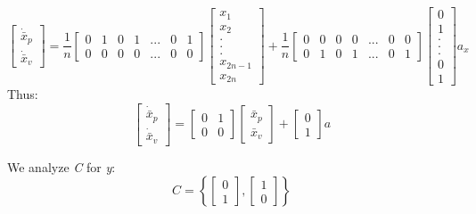 \documentclass[10pt,letterpaper]{article}
\begin{document}
\begin{flushleft}
\begin{equation}
\begin{bmatrix}
\dot{\bar{x}}_p \\
\dot{\bar{x}}_v
\end{bmatrix} = \frac{1}{n} \begin{bmatrix}
0& 1& 0& 1& ... &0& 1 \\
0& 0& 0& 0& ... &0& 0
\end{bmatrix}
\begin{bmatrix}
x_1\\
x_2\\
.\\
.\\
.\\
x_{2n-1}\\
x_{2n}
\end{bmatrix} + \frac{1}{n}\begin{bmatrix}
0& 0& 0& 0& ... &0& 0 \\
0& 1& 0& 1& ... &0& 1
\end{bmatrix}\begin{bmatrix} 
0\\
1\\
.\\
.\\
.\\
0\\
1
\end{bmatrix} a_x
\end{equation}
Thus:
\begin{equation}
\begin{bmatrix}
\dot{\bar{x}}_p \\
\dot{\bar{x}}_v
\end{bmatrix} = \begin{bmatrix}
0& 1 \\
0& 0
\end{bmatrix}
\begin{bmatrix}
\bar{x}_p\\
\bar{x}_v
\end{bmatrix} + \begin{bmatrix} 
0\\
1
\end{bmatrix} a
\end{equation}

We analyze \emph{C} for \emph{y}:
\begin{equation}
C=\left\{ \begin{bmatrix} 
0\\
1
\end{bmatrix}
,
 \begin{bmatrix} 
1\\
0
\end{bmatrix}
 \right\}
\end{equation}


\end{flushleft}
\end{document}
